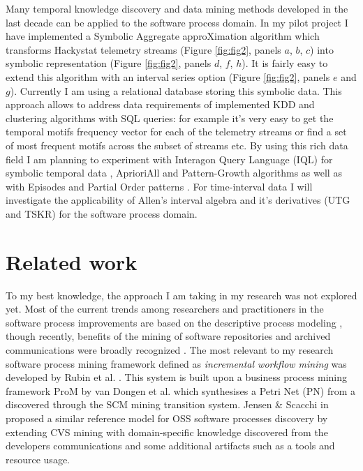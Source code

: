 \documentclass[11pt,oneside]{article}
\begin{document}
Many temporal knowledge discovery and data mining methods developed in the last decade can be applied to the software process domain. In my pilot project I have implemented a Symbolic Aggregate approXimation algorithm \cite{citeulike:2821475} which transforms Hackystat telemetry streams (Figure \ref{fig:fig2}, panels $a$, $b$, $c$) into symbolic representation (Figure \ref{fig:fig2}, panels $d$, $f$, $h$). It is fairly easy to extend this algorithm with an interval series option (Figure \ref{fig:fig2}, panels $e$ and $g$). Currently I am using a relational database storing this symbolic data. This approach allows to address data requirements of implemented KDD and clustering algorithms with SQL queries: for example it's very easy to get the temporal motifs frequency vector for each of the telemetry streams or find a set of most frequent motifs across the subset of streams etc. By using this rich data field I am planning to experiment with Interagon Query Language (IQL) for symbolic temporal data \cite{citeulike:5043086}, AprioriAll \cite{citeulike:775528} and Pattern-Growth algorithms \cite{citeulike:5043097} as well as with Episodes \cite{citeulike:5043099} and Partial Order patterns \cite{citeulike:5043101}. For time-interval data I will investigate the applicability of Allen's interval algebra \cite{citeulike:191348} and it's derivatives (UTG \cite{citeulike:5043086} and TSKR\cite{citeulike:3978076}) for the software process domain. 

\section{Related work}
To my best knowledge, the approach I am taking in my research was not explored yet. Most of the current trends among researchers and practitioners in the software process improvements are based on the descriptive process modeling \cite{citeulike:5043670}, though recently, benefits of the mining of software repositories and archived communications were broadly recognized \cite{citeulike:5043676}. The most relevant to my research software process mining framework defined as \textit{incremental workflow mining} was developed by Rubin et al. \cite{citeulike:1885717}. This system is built upon a business process mining framework ProM by van Dongen et al.\cite{citeulike:5043673} which synthesises a Petri Net (PN) from a discovered through the SCM mining transition system. Jensen \& Scacchi in \cite{citeulike:5043664} proposed a similar reference model for OSS software processes discovery by extending CVS mining with domain-specific knowledge discovered from the developers communications and some additional artifacts such as a tools and resource usage. 
\end{document}
